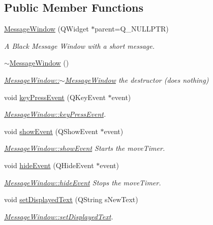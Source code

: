 \subsection*{Public Member Functions}
\begin{DoxyCompactItemize}
\item 
\mbox{\label{classMessageWindow_a177e3e28e1c3674b6115c34772d9e31f}} 
\mbox{\hyperlink{classMessageWindow_a177e3e28e1c3674b6115c34772d9e31f}{Message\+Window}} (Q\+Widget $\ast$parent=Q\+\_\+\+N\+U\+L\+L\+P\+TR)
\begin{DoxyCompactList}\small\item\em A Black Message Window with a short message. \end{DoxyCompactList}\item 
\mbox{\label{classMessageWindow_a1a4662f35424a8c9be0a9f9b04ccf86f}} 
\mbox{\hyperlink{classMessageWindow_a1a4662f35424a8c9be0a9f9b04ccf86f}{$\sim$\+Message\+Window}} ()
\begin{DoxyCompactList}\small\item\em \mbox{\hyperlink{classMessageWindow_a1a4662f35424a8c9be0a9f9b04ccf86f}{Message\+Window\+::$\sim$\+Message\+Window}} the destructor (does nothing) \end{DoxyCompactList}\item 
void \mbox{\hyperlink{classMessageWindow_adc919ddd8974835eb9f44d9cd5362f18}{key\+Press\+Event}} (Q\+Key\+Event $\ast$event)
\begin{DoxyCompactList}\small\item\em \mbox{\hyperlink{classMessageWindow_adc919ddd8974835eb9f44d9cd5362f18}{Message\+Window\+::key\+Press\+Event}}. \end{DoxyCompactList}\item 
void \mbox{\hyperlink{classMessageWindow_aee9d8dca7a7576d47eab37c8cb30a26d}{show\+Event}} (Q\+Show\+Event $\ast$event)
\begin{DoxyCompactList}\small\item\em \mbox{\hyperlink{classMessageWindow_aee9d8dca7a7576d47eab37c8cb30a26d}{Message\+Window\+::show\+Event}} Starts the move\+Timer. \end{DoxyCompactList}\item 
void \mbox{\hyperlink{classMessageWindow_aec91ce8e6e2ad404dc79f141fa9ce7b0}{hide\+Event}} (Q\+Hide\+Event $\ast$event)
\begin{DoxyCompactList}\small\item\em \mbox{\hyperlink{classMessageWindow_aec91ce8e6e2ad404dc79f141fa9ce7b0}{Message\+Window\+::hide\+Event}} Stops the move\+Timer. \end{DoxyCompactList}\item 
void \mbox{\hyperlink{classMessageWindow_ad3b6dcb371660e6a3e0ded36564afafa}{set\+Displayed\+Text}} (Q\+String s\+New\+Text)
\begin{DoxyCompactList}\small\item\em \mbox{\hyperlink{classMessageWindow_ad3b6dcb371660e6a3e0ded36564afafa}{Message\+Window\+::set\+Displayed\+Text}}. \end{DoxyCompactList}\end{DoxyCompactItemize}


